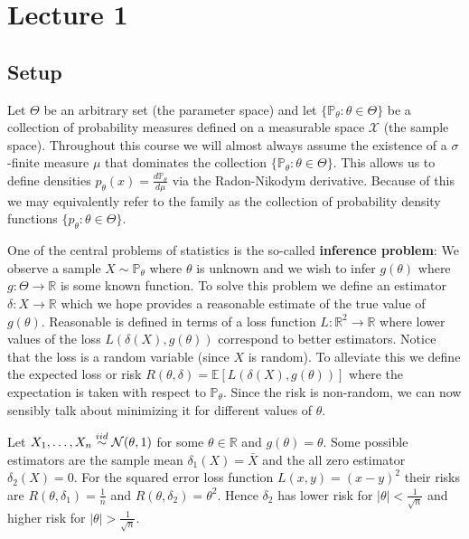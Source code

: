 \section{Lecture 1}

\subsection{Setup} 
Let $\Theta$ be an arbitrary set (the parameter space) and let $\{\mathbb P_\theta : \theta \in \Theta\}$ be a collection of probability measures defined on a measurable space $\mathcal{X}$ (the sample space). Throughout this course we will almost always assume the existence of a $\sigma$-finite measure $\mu$ that dominates the collection $\{\mathbb P_\theta : \theta \in \Theta\}$. This allows us to define densities $p_\theta(x) = \frac{d\mathbb P_\theta}{d\mu}$ via the Radon-Nikodym derivative. Because of this we may equivalently refer to the family as the collection of probability density functions $\{ p_\theta : \theta \in \Theta\}$.

\medskip \noindent One of the central problems of statistics is the so-called \textbf{inference problem}: We observe a sample $X \sim \mathbb P_\theta$ where $\theta$ is unknown and we wish to infer $g(\theta)$ where $g : \Theta \to \mathbb R$ is some known function. To solve this problem we define an estimator $\delta : X \to \mathbb R$ which we hope provides a reasonable estimate of the true value of $g(\theta)$. Reasonable is defined in terms of a loss function $L : \mathbb R^2 \to \mathbb R$ where lower values of the loss $L(\delta(X), g(\theta))$ correspond to better estimators. Notice that the loss is a random variable (since $X$ is random). To alleviate this we define the expected loss or risk $R(\theta, \delta) = \mathbb E[ L(\delta(X), g(\theta))]$ where the expectation is taken with respect to $\mathbb P_\theta$. Since the risk is non-random, we can now sensibly talk about minimizing it for different values of $\theta$.  

\begin{example}
	Let $X_1, \dots, X_n \overset{iid}{\sim} \mathcal{N}(\theta,1)$ for some $\theta \in \mathbb R$ and $g(\theta) = \theta$. Some possible estimators are the sample mean $\delta_1(X) = \bar X$ and the all zero estimator $\delta_2(X) = 0$. For the squared error loss function $L(x, y) = (x-y)^2$ their risks are $R(\theta, \delta_1) = \frac{1}{n}$ and $R(\theta, \delta_2) = \theta^2$. Hence $\delta_2$ has lower risk for $|\theta| < \frac{1}{\sqrt{n}}$ and higher risk for $|\theta| > \frac{1}{\sqrt{n}}$.
\end{example}

